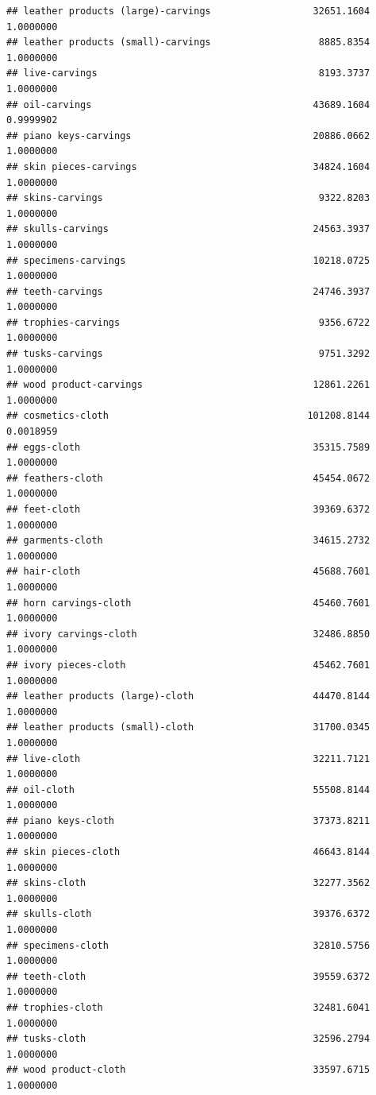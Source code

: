 \documentclass[
  12pt,
]{article}
\begin{document}
\begin{verbatim}
## leather products (large)-carvings                  32651.1604 1.0000000
## leather products (small)-carvings                   8885.8354 1.0000000
## live-carvings                                       8193.3737 1.0000000
## oil-carvings                                       43689.1604 0.9999902
## piano keys-carvings                                20886.0662 1.0000000
## skin pieces-carvings                               34824.1604 1.0000000
## skins-carvings                                      9322.8203 1.0000000
## skulls-carvings                                    24563.3937 1.0000000
## specimens-carvings                                 10218.0725 1.0000000
## teeth-carvings                                     24746.3937 1.0000000
## trophies-carvings                                   9356.6722 1.0000000
## tusks-carvings                                      9751.3292 1.0000000
## wood product-carvings                              12861.2261 1.0000000
## cosmetics-cloth                                   101208.8144 0.0018959
## eggs-cloth                                         35315.7589 1.0000000
## feathers-cloth                                     45454.0672 1.0000000
## feet-cloth                                         39369.6372 1.0000000
## garments-cloth                                     34615.2732 1.0000000
## hair-cloth                                         45688.7601 1.0000000
## horn carvings-cloth                                45460.7601 1.0000000
## ivory carvings-cloth                               32486.8850 1.0000000
## ivory pieces-cloth                                 45462.7601 1.0000000
## leather products (large)-cloth                     44470.8144 1.0000000
## leather products (small)-cloth                     31700.0345 1.0000000
## live-cloth                                         32211.7121 1.0000000
## oil-cloth                                          55508.8144 1.0000000
## piano keys-cloth                                   37373.8211 1.0000000
## skin pieces-cloth                                  46643.8144 1.0000000
## skins-cloth                                        32277.3562 1.0000000
## skulls-cloth                                       39376.6372 1.0000000
## specimens-cloth                                    32810.5756 1.0000000
## teeth-cloth                                        39559.6372 1.0000000
## trophies-cloth                                     32481.6041 1.0000000
## tusks-cloth                                        32596.2794 1.0000000
## wood product-cloth                                 33597.6715 1.0000000

\end{verbatim}
\end{document}
